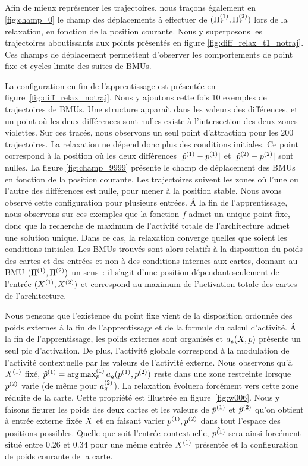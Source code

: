 \documentclass[../main]{subfiles}
\begin{document}
Afin de mieux représenter les trajectoires, nous traçons également en \ref{fig:champ_0} le champ des déplacements à effectuer de $(\Pi^{({1})}_\tau,\Pi^{({2})}_\tau)$ lors de la relaxation, en fonction de la position courante. 
Nous y superposons les trajectoires aboutissants aux points présentés en figure \ref{fig:diff_relax_t1_notraj}.
Ces champs de déplacement permettent d'observer les comportements de point fixe et cycles limite des suites de BMUs.


La configuration en fin de l'apprentissage est présentée en figure~\ref{fig:diff_relax_notraj}. Nous y ajoutons cette fois 10 exemples de trajectoires de BMUs.
Une structure apparaît dans les valeurs des différences, et un point où les deux différences sont nulles existe à l'intersection des deux zones violettes.
Sur ces tracés, nous observons un seul point d'attraction pour les 200 trajectoires. La relaxation ne dépend donc plus des conditions initiales.
Ce point correspond à la position où les deux différences $\lvert \hat{p}^{({1})} - p^{({1})} \rvert$ et $\lvert \hat{p}^{({2})} - p^{({2})}\rvert$ sont nulles.
La figure \ref{fig:champ_9999} présente le champ de déplacement des BMUs en fonction de la position courante. Les trajectoires suivent les zones où l'une ou l'autre des différences est nulle, pour mener à la position stable. 
Nous avons observé cette configuration pour plusieurs entrées.
\'A la fin de l'apprentissage, nous observons sur ces exemples que la fonction $f$ admet un unique point fixe, donc que la recherche de maximum de l'activité totale de l'architecture admet une solution unique.
 Dans ce cas, la relaxation converge quelles que soient les conditions initiales. Les BMUs trouvés sont alors relatifs à la disposition du poids des cartes et des entrées et non à des conditions internes aux cartes, donnant au BMU $(\Pi^{({1})},\Pi^{({2})})$ un sens~: il s'agit d'une position dépendant seulement de l'entrée $(X^{({1})},X^{({2})})$ et correspond au maximum de l'activation totale des cartes de l'architecture.

Nous pensons que l'existence du point fixe vient de la disposition ordonnée des poids externes à la fin de l'apprentissage et de la formule du calcul d'activité.
\'A la fin de l'apprentissage, les poids externes sont organisés et $a_e(X,p)$ présente un seul pic d'activation.
De plus, l'activité globale correspond à la modulation de l'activité contextuelle par les valeurs de l'activité externe. 
Nous observons qu'à $X^{({1})}$ fixé, $\hat{p}^{({1})} = \operatorname*{arg\,max}_p^{({1})} a_g(p^{({1})}, p^{({2})})$ reste dans une zone restreinte lorsque $p^{({2})}$ varie (de même pour $a_g^{({2})}$). 
La relaxation évoluera forcément vers cette zone réduite de la carte.
Cette propriété est illustrée en figure~\ref{fig:w006}.
Nous y faisons figurer les poids des deux cartes et les valeurs de $\hat{p}^{({1})}$ et $\hat{p}^{({2})}$ qu'on obtient à entrée externe fixée $X$ et en faisant varier $p^{({1})}, p^{({2})}$ dans tout l'espace des positions possibles. Quelle que soit l'entrée contextuelle, $\hat{p^{({1})}}$ sera ainsi forcément situé entre 0.26 et 0.34 pour une même entrée $X^{({1})}$ présentée et la configuration de poids courante de la carte.
\end{document}
